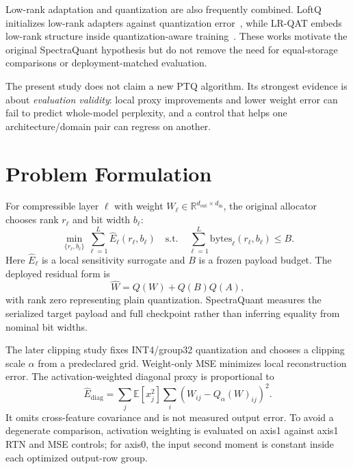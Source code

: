 \documentclass[10pt,twocolumn]{article}
\newcommand{\bytes}{\mathrm{bytes}}
\begin{document}
Low-rank adaptation and quantization are also frequently combined. LoftQ
initializes low-rank adapters against quantization error~\cite{loftq}, while
LR-QAT embeds low-rank structure inside quantization-aware training~\cite{lrqat}.
These works motivate the original SpectraQuant hypothesis but do not remove the
need for equal-storage comparisons or deployment-matched evaluation.

The present study does not claim a new PTQ algorithm. Its strongest evidence is
about \emph{evaluation validity}: local proxy improvements and lower weight
error can fail to predict whole-model perplexity, and a control that helps one
architecture/domain pair can regress on another.

\section{Problem Formulation}

For compressible layer $\ell$ with weight
$W_\ell\in\mathbb{R}^{d_{\mathrm{out}}\times d_{\mathrm{in}}}$, the original
allocator chooses rank $r_\ell$ and bit width $b_\ell$:
\begin{equation}
\min_{\{r_\ell,b_\ell\}}\sum_{\ell=1}^{L}\widehat{E}_{\ell}(r_\ell,b_\ell)
\quad\mathrm{s.t.}\quad
\sum_{\ell=1}^{L}\bytes_\ell(r_\ell,b_\ell)\leq B .
\label{eq:allocation}
\end{equation}
Here $\widehat{E}_\ell$ is a local sensitivity surrogate and $B$ is a frozen
payload budget. The deployed residual form is
\begin{equation}
\widehat{W}=Q(W)+Q(B)Q(A),
\end{equation}
with rank zero representing plain quantization. SpectraQuant measures the
serialized target payload and full checkpoint rather than inferring equality
from nominal bit widths.

The later clipping study fixes INT4/group32 quantization and chooses a clipping
scale $\alpha$ from a predeclared grid. Weight-only MSE minimizes local
reconstruction error. The activation-weighted diagonal proxy is proportional to
\begin{equation}
\widehat{E}_{\mathrm{diag}} =
\sum_j \mathbb{E}[x_j^2]\sum_i
\left(W_{ij}-Q_\alpha(W)_{ij}\right)^2 .
\label{eq:diagproxy}
\end{equation}
It omits cross-feature covariance and is not measured output error. To avoid a
degenerate comparison, activation weighting is evaluated on axis1 against
axis1 RTN and MSE controls; for axis0, the input second moment is constant
inside each optimized output-row group.
\end{document}
